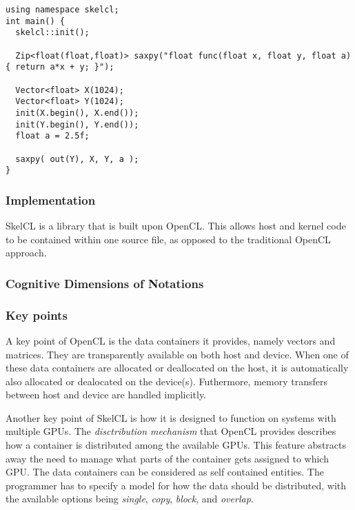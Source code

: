 \begin{lstlisting}[caption={Computation of the dot product of two vectors}, label=code:skelclSample] 
using namespace skelcl;
int main() {
  skelcl::init();

  Zip<float(float,float)> saxpy("float func(float x, float y, float a){ return a*x + y; }");

  Vector<float> X(1024);      
  Vector<float> Y(1024);
  init(X.begin(), X.end()); 
  init(Y.begin(), Y.end());
  float a = 2.5f;

  saxpy( out(Y), X, Y, a );
}
\end{lstlisting}

\subsubsection{Implementation}
SkelCL is a library that is built upon OpenCL. This allows host and kernel code to be contained within one source file, as opposed to the traditional OpenCL approach.

\subsubsection{Cognitive Dimensions of Notations}

\subsubsection{Key points}
A key point of OpenCL is the data containers it provides, namely vectors and matrices. They are transparently available on both host and device. When one of these data containers are allocated or deallocated on the host, it is automatically also allocated or dealocated on the device(s). Futhermore, memory transfers between host and device are handled implicitly.

Another key point of SkelCL is how it is designed to function on systems with multiple GPUs. The \textit{disctribution mechanism} that OpenCL provides describes how a container is distributed among the available GPUs. This feature abstracts away the need to manage what parts of the container gets assigned to which GPU. The data containers can be considered as self contained entities. The programmer has to specify a model for how the data should be distributed, with the available options being \textit{single}, \textit{copy}, \textit{block}, and \textit{overlap}.


